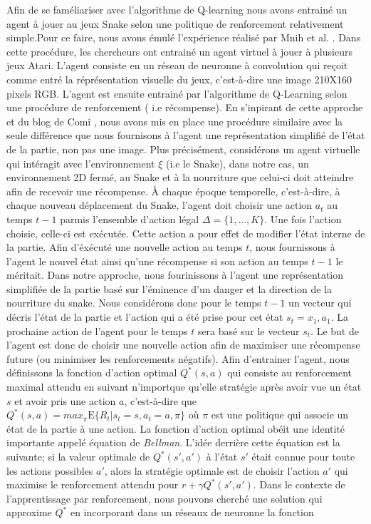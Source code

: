 \documentclass{article}
\begin{document}
Afin de se faméliariser avec l'algorithme de Q-learning nous avons entrainé un agent à jouer au jeux Snake selon  une politique de renforcement relativement simple.Pour ce faire, nous avons émulé l'expérience réalisé par Mnih et al. \cite{DBLP:journals/corr/MnihKSGAWR13}. Dans cette procédure, les chercheurs ont entrainé un agent virtuel à jouer à plusieurs jeux Atari. L'agent consiste en un réseau de neuronne à convolution qui reçoit comme entré la réprésentation visuelle du jeux, c'est-à-dire une image 210X160 pixels RGB. L'agent est ensuite entrainé par l'algorithme de Q-Learning selon une procédure de renforcement ( i.e récompense). En s'inpirant de cette approche et du blog de Comi \cite{comi_2020}, nous avons mis en place une procédure similaire avec la seule différence que nous fournisons à l'agent une représentation simplifié de l'état de la partie, non pas une image.  Plus précisément, considérons un agent virtuelle qui intéragit avec l'environnement $\xi$ (i.e le Snake), dans notre cas, un environnement 2D fermé, au Snake
et à la nourriture que celui-ci doit atteindre afin de recevoir une récompense. À chaque époque temporelle, c'est-à-dire, à chaque nouveau déplacement du Snake, l'agent doit choisir une action  $a_t$ au temps $t-1$  parmis l'ensemble d'action légal $\Delta  = \{1, ..., K\}$. Une fois l'action choisie, celle-ci est exécutée. Cette action a pour effet de modifier l'état interne de la partie. Afin d'éxécuté une nouvelle action au temps $t$, nous fournissons à l'agent le nouvel état ainsi qu'une récompense si son action au temps $t-1$ le méritait. Dans notre approche, nous fourinissons à l'agent une représentation simplifiée de la partie basé sur l'éminence d'un danger et la direction de la nourriture du snake. Nous considérons donc pour le temps $t-1$ un vecteur qui décris l'état de la partie et l'action qui a été prise pour cet état $s_t = x_{1}, a_{1}$. La prochaine action de l'agent pour le temps $t$ sera basé sur le vecteur $s_t$. Le but de l'agent est donc de choisir une nouvelle action afin de maximiser une récompense future (ou minimiser les renforcements négatifs). Afin d'entrainer l'agent, nous définissons la fonction d'action optimal $Q^*(s,a)$ qui consiste au renforcement maximal attendu en suivant n'importque qu'elle stratégie après avoir vue un état $s$ et avoir pris une action $a$, c'est-à-dire que $Q^*(s,a)= max_\pi 	\mathrm{E} \{R_t | s_t = s, a_{t} = a, \pi\}$ où $\pi$ est une politique qui associe un état de la partie à une action.  La fonction d'action optimal obéit une identité importante appelé équation de \textit{Bellman}. L'idée derrière cette équation est la suivante; si la valeur optimale de $Q^*(s',a')$ à l'état $s'$ était connue pour toute les actions possibles $a'$, alors la stratégie optimale est de choisir l'action $a'$ qui maximise le renforcement attendu pour $r + \gamma Q^*(s',a')$. Dans le contexte de l'apprentissage par renforcement, nous pouvons cherché une solution qui approxime $Q^*$ en incorporant dans un réseaux de neuronne la fonction 
\end{document}
